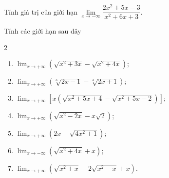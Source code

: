 \begin{ex}%
	 Tính giá trị của giới hạn $\lim\limits_{x\to -\infty }\dfrac{2x^2+5x-3}{x^2+6x+3}$.
\end{ex}

\begin{ex}%

	Tính các giới  hạn sau đây
	\allowdisplaybreaks 
	\begin{multicols}{2}
		\begin{enumerate}
			\item $\displaystyle\lim_{x \to +\infty}\left(\sqrt{x^2+3x}-\sqrt{x^2+4x} \right)$; 
			\item $\displaystyle\lim_{x \to  +\infty}\left(\sqrt[3]{2x-1}-\sqrt[3]{2x+1} \right)$;
			\item  $\displaystyle\lim_{x \to +\infty}\left[x\left(\sqrt{x^2+5x+4}-\sqrt{x^2+5x-2}\right)\right]$;
			\item  $\displaystyle\lim_{x \to +\infty}\left(\sqrt{x^2-2x}-x\sqrt{2} \right)$;
			 \item $\displaystyle\lim_{x \to +\infty}\left(2x-\sqrt{4x^2+1}\right)$;
			\item  $\displaystyle\lim_{x \to -\infty}\left(\sqrt{x^2+4x}+x\right)$;
			\item $\displaystyle\lim_{x  \to +\infty}\left(\sqrt{x^2+x}-2\sqrt{x^2-x}+x\right)$.
		\end{enumerate}
	\end{multicols}
\end{ex}
